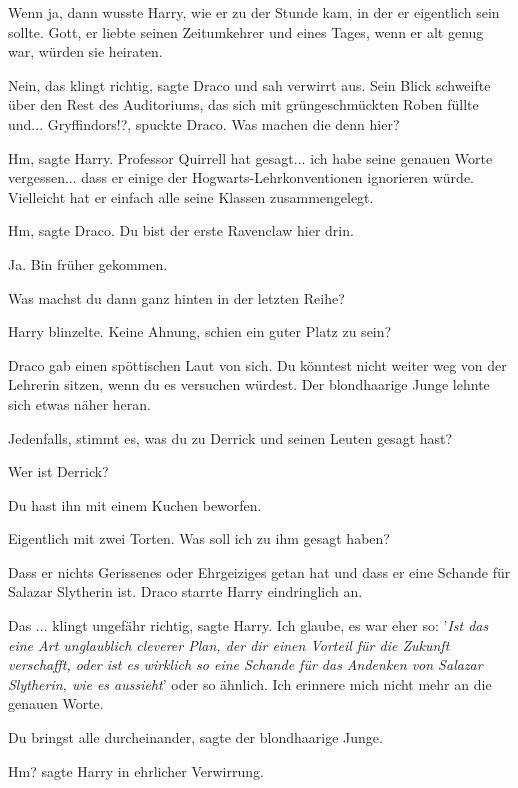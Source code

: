 Wenn ja, dann wusste Harry, wie er zu der Stunde kam, in der er eigentlich sein
sollte. Gott, er liebte seinen Zeitumkehrer und eines Tages, wenn er alt genug
war, würden sie heiraten.

\glqq Nein, das klingt richtig\grqq{}, sagte Draco und sah verwirrt aus. Sein
Blick schweifte über den Rest des Auditoriums, das sich mit grüngeschmückten
Roben füllte und... \glqq Gryffindors!?\grqq{}, spuckte Draco. \glqq Was machen
die denn hier?\grqq{}

\glqq Hm\grqq{}, sagte Harry. \glqq Professor Quirrell hat gesagt... ich habe
seine genauen Worte vergessen... dass er einige der Hogwarts-Lehrkonventionen
ignorieren würde. Vielleicht hat er einfach alle seine Klassen
zusammengelegt.\grqq{}

\glqq Hm\grqq{}, sagte Draco. \glqq Du bist der erste Ravenclaw hier
drin.\grqq{}

\glqq Ja. Bin früher gekommen.\grqq{}

\glqq Was machst du dann ganz hinten in der letzten Reihe?\grqq{}

Harry blinzelte. \glqq Keine Ahnung, schien ein guter Platz zu sein?\grqq{}

Draco gab einen spöttischen Laut von sich. \glqq Du könntest nicht weiter weg
von der Lehrerin sitzen, wenn du es versuchen würdest.\grqq{} Der blondhaarige
Junge lehnte sich etwas näher heran.

\glqq Jedenfalls, stimmt es, was du zu Derrick und seinen Leuten gesagt
hast?\grqq{}

\glqq Wer ist Derrick?\grqq{}

\glqq Du hast ihn mit einem Kuchen beworfen.\grqq{}

\glqq Eigentlich mit zwei Torten. Was soll ich zu ihm gesagt haben?\grqq{}

\glqq Dass er nichts Gerissenes oder Ehrgeiziges getan hat und dass er eine
Schande für Salazar Slytherin ist.\grqq{} Draco starrte Harry eindringlich an.

\glqq Das ... klingt ungefähr richtig\grqq{}, sagte Harry. \glqq Ich glaube, es
war eher so: '\emph{Ist das eine Art unglaublich cleverer Plan, der dir einen
Vorteil für die Zukunft verschafft, oder ist es wirklich so eine Schande für das
Andenken von Salazar Slytherin, wie es aussieht}' oder so ähnlich. Ich erinnere
mich nicht mehr an die genauen Worte.\grqq{}

\glqq Du bringst alle durcheinander\grqq{}, sagte der blondhaarige Junge.

\glqq Hm?\grqq{} sagte Harry in ehrlicher Verwirrung.

